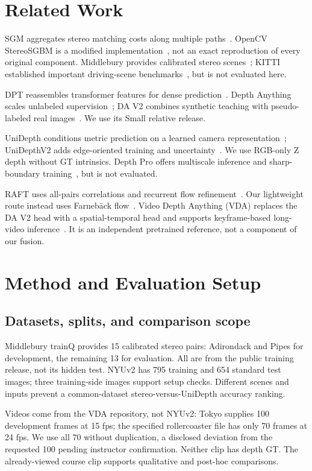 \documentclass[10pt,twocolumn,letterpaper]{article}
\begin{document}
\section{Related Work}
SGM aggregates stereo matching costs along multiple paths~\cite{sgm}. OpenCV StereoSGBM is a modified implementation~\cite{opencv}, not an exact reproduction of every original component. Middlebury provides calibrated stereo scenes~\cite{middlebury}; KITTI established important driving-scene benchmarks~\cite{kitti}, but is not evaluated here.

DPT reassembles transformer features for dense prediction~\cite{dpt}. Depth Anything scales unlabeled supervision~\cite{dav1}; DA V2 combines synthetic teaching with pseudo-labeled real images~\cite{dav2}. We use its Small relative release.

UniDepth conditions metric prediction on a learned camera representation~\cite{unidepth}; UniDepthV2 adds edge-oriented training and uncertainty~\cite{unidepthv2}. We use RGB-only Z depth without GT intrinsics. Depth Pro offers multiscale inference and sharp-boundary training~\cite{depthpro}, but is not evaluated.

RAFT uses all-pairs correlations and recurrent flow refinement~\cite{raft}. Our lightweight route instead uses Farneb\"ack flow~\cite{farneback}. Video Depth Anything (VDA) replaces the DA V2 head with a spatial-temporal head and supports keyframe-based long-video inference~\cite{vda}. It is an independent pretrained reference, not a component of our fusion.

\section{Method and Evaluation Setup}
\subsection{Datasets, splits, and comparison scope}
Middlebury trainQ provides 15 calibrated stereo pairs: Adirondack and Pipes for development, the remaining 13 for evaluation. All are from the public training release, not its hidden test. NYUv2 has 795 training and 654 standard test images; three training-side images support setup checks. Different scenes and inputs prevent a common-dataset stereo-versus-UniDepth accuracy ranking.

Videos come from the VDA repository, not NYUv2: Tokyo supplies 100 development frames at 15 fps; the specified rollercoaster file has only 70 frames at 24 fps. We use all 70 without duplication, a disclosed deviation from the requested 100 pending instructor confirmation. Neither clip has depth GT. The already-viewed course clip supports qualitative and post-hoc comparisons.
\end{document}
